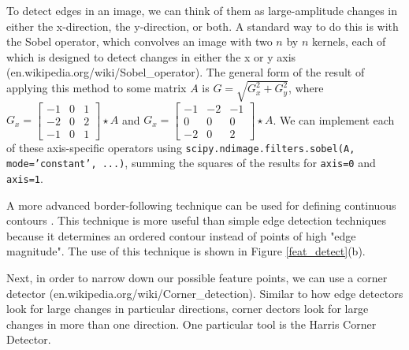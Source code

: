 \documentclass[paper=a4, fontsize=11pt]{scrartcl} %
\begin{document}
To detect edges in an image, we can think of them as large-amplitude changes in either the x-direction, the y-direction, or both. A standard way to do this is with the Sobel operator, which convolves an image with two $n$ by $n$ kernels, each of which is designed to detect changes in either the x or y axis (en.wikipedia.org/wiki/Sobel\_operator). The general form of the result of applying this method to some matrix $A$ is $G = \sqrt{G_x^2 + G_y^2}$, where $G_x = \begin{bmatrix}
-1& 0 & 1\\
-2 & 0& 2\\
-1 & 0& 1
\end{bmatrix}\star A$ and $G_x =\begin{bmatrix}
-1 & -2 & -1\\
0 & 0 & 0\\
-2 & 0 & 2
\end{bmatrix} \star A$. We can implement each of these axis-specific operators using \texttt{scipy.ndimage.filters.sobel(A, mode='constant', ...)}, summing the squares of the results for \texttt{axis=0} and \texttt{axis=1}.

A more advanced border-following technique can be used for defining continuous contours \cite{Suzuki1985}. This technique is more useful than simple edge detection techniques because it determines an ordered contour instead of points of high "edge magnitude". The use of this technique is shown in Figure \ref{feat_detect}(b).



Next, in order to narrow down our possible feature points, we can use a corner detector (en.wikipedia.org/wiki/Corner\_detection). Similar to how edge detectors look for large changes in particular directions, corner dectors look for large changes in more than one direction. One particular tool is the Harris Corner Detector.
\end{document}
